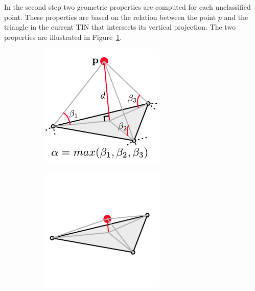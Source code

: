 In the second step two geometric properties are computed for each unclassified point.
These properties are based on the relation between the point $p$ and the triangle in the current TIN that intersects its vertical projection. 
The two properties are illustrated in Figure~\ref{fig:ground-filtering:symbols}.
\begin{figure}
  \centering
  \begin{subfigure}[b]{0.3\linewidth}
    \centering
    \includegraphics[width=\textwidth]{figs/groundfilter-symbols.pdf}
    \caption{}\label{fig:ground-filtering:symbols}
  \end{subfigure}
  \begin{subfigure}[b]{0.3\linewidth}
    \centering
    \includegraphics[width=\textwidth]{figs/groundfilter-ground.pdf}

\end{subfigure}
\end{figure}
